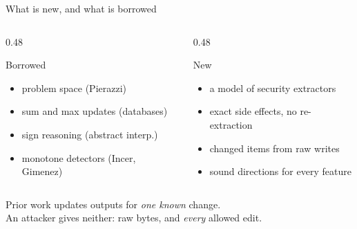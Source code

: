 \documentclass[aspectratio=169,11pt]{beamer}
\begin{document}
\begin{frame}{What is new, and what is borrowed}
  \begin{columns}[T]
    \begin{column}{0.48\textwidth}
      \begin{block}{Borrowed}
        \begin{itemize}
          \item problem space (Pierazzi)
          \item sum and max updates (databases)
          \item sign reasoning (abstract interp.)
          \item monotone detectors (Incer, Gimenez)
        \end{itemize}
      \end{block}
    \end{column}
    \begin{column}{0.48\textwidth}
      \begin{exampleblock}{New}
        \begin{itemize}
          \item a model of security extractors
          \item exact side effects, no re-extraction
          \item changed items from raw writes
          \item sound directions for every feature
        \end{itemize}
      \end{exampleblock}
    \end{column}
  \end{columns}
  \vfill
  \begin{center}
    Prior work updates outputs for \emph{one known} change.\\
    An attacker gives neither: raw bytes, and \emph{every} allowed edit.
  \end{center}
\end{frame}
\end{document}
